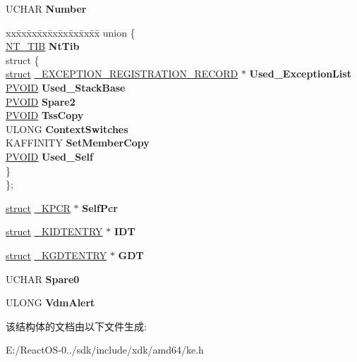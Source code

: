 \begin{DoxyCompactItemize}
\item 
\mbox{\label{struct___k_p_c_r_a966e4d958147736622aa765c95138d07}} 
U\+C\+H\+AR {\bfseries Number}
\item 
\mbox{\label{struct___k_p_c_r_adad7fa61add81780d7eea3a4353b48d0}} 
\begin{tabbing}
xx\=xx\=xx\=xx\=xx\=xx\=xx\=xx\=xx\=\kill
union \{\\
\>\hyperlink{struct___n_t___t_i_b}{NT\_TIB} {\bfseries NtTib}\\
\mbox{\label{union___k_p_c_r_1_1_0D3477_a4b379c13eafa86a263a7cb4b3bc9ff3b}} 
\>struct \{\\
\>\>\hyperlink{interfacestruct}{struct} \hyperlink{struct___e_x_c_e_p_t_i_o_n___r_e_g_i_s_t_r_a_t_i_o_n___r_e_c_o_r_d}{\_EXCEPTION\_REGISTRATION\_RECORD} $\ast$ {\bfseries Used\_ExceptionList}\\
\>\>\hyperlink{interfacevoid}{PVOID} {\bfseries Used\_StackBase}\\
\>\>\hyperlink{interfacevoid}{PVOID} {\bfseries Spare2}\\
\>\>\hyperlink{interfacevoid}{PVOID} {\bfseries TssCopy}\\
\>\>ULONG {\bfseries ContextSwitches}\\
\>\>KAFFINITY {\bfseries SetMemberCopy}\\
\>\>\hyperlink{interfacevoid}{PVOID} {\bfseries Used\_Self}\\
\>\} \\
\}; \\

\end{tabbing}\item 
\mbox{\label{struct___k_p_c_r_ab6df8b60acc9db7dd7986b4e0d12b589}} 
\hyperlink{interfacestruct}{struct} \hyperlink{struct___k_p_c_r}{\+\_\+\+K\+P\+CR} $\ast$ {\bfseries Self\+Pcr}
\item 
\mbox{\label{struct___k_p_c_r_a91d506d14a528e6a0bd2d11e9216308d}} 
\hyperlink{interfacestruct}{struct} \hyperlink{struct___k_i_d_t_e_n_t_r_y}{\+\_\+\+K\+I\+D\+T\+E\+N\+T\+RY} $\ast$ {\bfseries I\+DT}
\item 
\mbox{\label{struct___k_p_c_r_a505c1ba097f3896e10d667bd657e754d}} 
\hyperlink{interfacestruct}{struct} \hyperlink{struct___k_g_d_t_e_n_t_r_y}{\+\_\+\+K\+G\+D\+T\+E\+N\+T\+RY} $\ast$ {\bfseries G\+DT}
\item 
\mbox{\label{struct___k_p_c_r_aaa773ed849c34141d2080008f7669dcd}} 
U\+C\+H\+AR {\bfseries Spare0}
\item 
\mbox{\label{struct___k_p_c_r_abacab1c68c8271def5b7199dfbfe4463}} 
U\+L\+O\+NG {\bfseries Vdm\+Alert}
\end{DoxyCompactItemize}


该结构体的文档由以下文件生成\+:\begin{DoxyCompactItemize}
\item 
E\+:/\+React\+O\+S-\/0../sdk/include/xdk/amd64/ke.\+h\end{DoxyCompactItemize}
